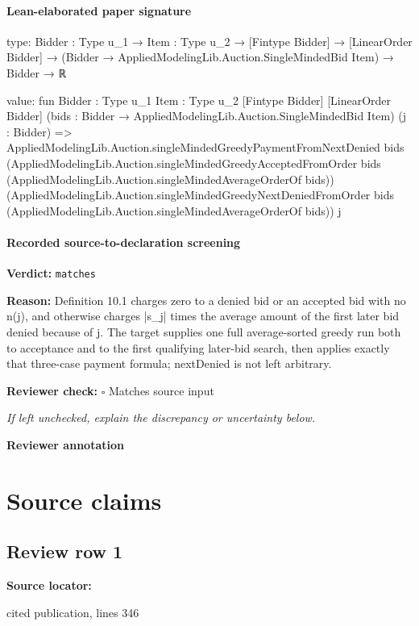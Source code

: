 \documentclass[10pt]{article}
\newcommand{\reviewerbox}{%
  \par\noindent\fbox{\parbox{0.96\linewidth}{\rule{0pt}{0.38in}}}\par
}
\newcommand{\reviewmatch}[1]{%
  \par\noindent\textbf{Reviewer check:} $\square$\; #1\par
  \noindent\emph{If left unchecked, explain the discrepancy or uncertainty below.}\par
}
\begin{document}
\paragraph{Lean-elaborated paper signature}
\begin{ReviewVerbatim}
type:
{Bidder : Type u_1} →
  {Item : Type u_2} →
    [Fintype Bidder] → [LinearOrder Bidder] → (Bidder → AppliedModelingLib.Auction.SingleMindedBid Item) → Bidder → ℝ

value:
fun {Bidder : Type u_1} {Item : Type u_2} [Fintype Bidder] [LinearOrder Bidder]
    (bids : Bidder → AppliedModelingLib.Auction.SingleMindedBid Item) (j : Bidder) =>
  AppliedModelingLib.Auction.singleMindedGreedyPaymentFromNextDenied bids
    (AppliedModelingLib.Auction.singleMindedGreedyAcceptedFromOrder bids
      (AppliedModelingLib.Auction.singleMindedAverageOrderOf bids))
    (AppliedModelingLib.Auction.singleMindedGreedyNextDeniedFromOrder bids
      (AppliedModelingLib.Auction.singleMindedAverageOrderOf bids))
    j
\end{ReviewVerbatim}


\paragraph{Recorded source-to-declaration screening}
\textbf{Verdict:} \texttt{matches}
\\
{\raggedright
\textbf{Reason:} Definition 10.\allowbreak{}1 charges zero to a denied bid or an accepted bid with no n(j), and otherwise charges |s\_\allowbreak{}j| times the average amount of the first later bid denied because of j.\allowbreak{} The target supplies one full average-\allowbreak{}sorted greedy run both to acceptance and to the first qualifying later-\allowbreak{}bid search, then applies exactly that three-\allowbreak{}case payment formula;\allowbreak{} nextDenied is not left arbitrary.\allowbreak{}
\par}
\reviewmatch{Matches source input}
\noindent\textbf{Reviewer annotation}\par
\reviewerbox

\clearpage
\hypertarget{source-claim-8602b5e535bd3ea1}{}
\hypertarget{source-section-f10b5f68e4acf3dc}{}
\section*{Source claims}
\subsection*{Review row 1}
\textbf{Source locator:} {\footnotesize\raggedright cited publication, lines 346\par}
\end{document}
